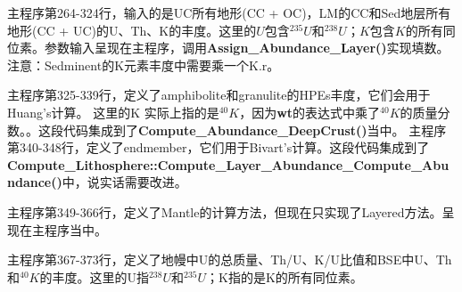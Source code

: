 		\begin{GCBox}[title = 丰度相关]{}
			主程序第264-324行，输入的是UC所有地形(CC + OC)，LM的CC和Sed地层所有地形(CC + UC)的U、Th、K的丰度。这里的$U$包含${}^{235}U$和${}^{238}U$；$K$包含$K$的所有同位素。参数输入呈现在主程序，调用\textbf{Assign\_Abundance\_Layer()}实现填数。
			\tcbline
			{\color{red}注意：Sedminent的K元素丰度中需要乘一个K.r。}
		\end{GCBox}
		\begin{GCBox}[title = DeepCrust相关]{}
			主程序第325-339行，定义了amphibolite和granulite的HPEs丰度，它们会用于Huang's计算。{\color{red} 这里的K 实际上指的是${}^{40}K$，因为\textbf{wt}的表达式中乘了${}^{40}K$的质量分数。}。这段代码集成到了\textbf{Compute\_Abundance\_DeepCrust()}当中。
			\tcbline
			主程序第340-348行，定义了endmember，它们用于Bivart's计算。这段代码集成到了\textbf{Compute\_Lithosphere::Compute\_Layer\_Abundance\_Compute\_Abundance()}中，说实话需要改进。
		\end{GCBox}
		\begin{GCBox}[title = Mantle方法的统计]{}
			主程序第349-366行，定义了Mantle的计算方法，但现在只实现了Layered方法。呈现在主程序当中。
		\end{GCBox}
		\begin{GCBox}[title = BSE相关]{}
			主程序第367-373行，定义了地幔中U的总质量、Th/U、K/U比值和BSE中U、Th和${}^{40}K$的丰度。这里的U指${}^{238}U$和${}^{235}U$；K指的是K的所有同位素。
		\end{GCBox}
